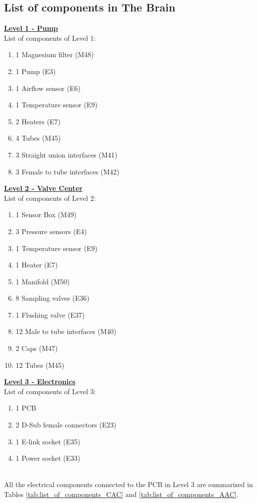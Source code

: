 \documentclass[a4paper,12pt,twoside]{article}
\begin{document}
\begin{appendices}
\subsection{List of components in The Brain}
\label{list-of-components-brain}
\textbf{\underline{Level 1 - Pump}}
\\
List of components of Level 1:

\begin{enumerate}[label=\Alph*.]
    \item 1 Magnesium filter (M48)
    \item 1 Pump (E3)
    \item 1 Airflow sensor (E6)
    \item 1 Temperature sensor (E9)
    \item 2 Heaters (E7)
    \item 4 Tubes (M45)
    \item 3 Straight union interfaces (M41)
    \item 3 Female to tube interfaces (M42)
\end{enumerate}

\textbf{\underline{Level 2 - Valve Center}}
\\
List of components of Level 2:

\begin{enumerate}[label=\Alph*.]
    \item 1 Sensor Box (M49)
    \item 3 Pressure sensors (E4)
    \item 1 Temperature sensor (E9)
    \item 1 Heater (E7)
    \item 1 Manifold (M50)
    \item 8 Sampling valves (E36)
    \item 1 Flushing valve (E37)
    \item 12 Male to tube interfaces (M40)
    \item 2 Caps (M47)
    \item 12 Tubes (M45)
\end{enumerate}

\textbf{\underline{Level 3 - Electronics}}
\\
List of components of Level 3:
\begin{enumerate}[label=\Alph*.]
    \item 1 PCB
    \item 2 D-Sub female connectors (E23)
    \item 1 E-link socket (E35)
    \item 1 Power socket (E33)
\end{enumerate}
\\
All the electrical components connected to the PCB in Level 3 are summarized in Tables \ref{tab:list_of_components_CAC} and \ref{tab:list_of_components_AAC}. 
\begin{table}[H]
\centering


\end{table}
\end{appendices}
\end{document}
